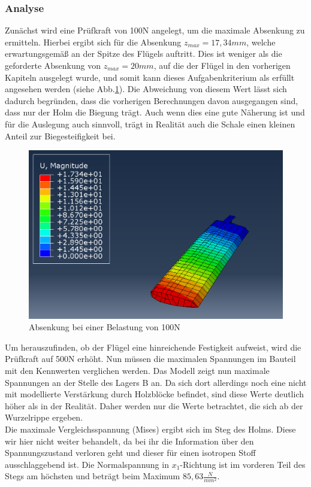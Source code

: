 \subsubsection{Analyse}
Zunächst wird eine Prüfkraft von 100N angelegt, um die maximale Absenkung zu ermitteln. Hierbei ergibt sich für die Absenkung $z_{max}=17,34mm$, welche erwartungsgemäß an der Spitze des Flügels auftritt. Dies ist weniger als die geforderte Absenkung von $z_{max}=20mm$, auf die der Flügel in den vorherigen Kapiteln ausgelegt wurde, und somit kann dieses Aufgabenkriterium als erfüllt angesehen werden (siehe Abb.\ref{Absenkung}). Die Abweichung von diesem Wert lässt sich dadurch begründen, dass die vorherigen Berechnungen davon ausgegangen sind, dass nur der Holm die Biegung trägt. Auch wenn dies eine gute Näherung ist und für die Auslegung auch sinnvoll, trägt in Realität auch die Schale einen kleinen Anteil zur Biegesteifigkeit bei.
\begin{figure}[h]
 \centering
 \includegraphics[scale=0.4]{Bilder/Absenkung_100N}
 \caption{Absenkung bei einer Belastung von 100N}
 \label{Absenkung}
\end{figure}
\noindent
Um herauszufinden, ob der Flügel eine hinreichende Festigkeit aufweist, wird die Prüfkraft auf 500N erhöht. Nun müssen die maximalen Spannungen im Bauteil mit den Kennwerten verglichen werden. Das Modell zeigt nun maximale Spannungen an der Stelle des Lagers B an. Da sich dort allerdings noch eine nicht mit modellierte Verstärkung durch Holzblöcke befindet, sind diese Werte deutlich höher als in der Realität. Daher werden nur die Werte betrachtet, die sich ab der Wurzelrippe ergeben.\\
Die maximale Vergleichsspannung (Mises) ergibt sich im Steg des Holms. Diese wir hier nicht weiter behandelt, da bei ihr die Information über den Spannungszustand verloren geht und dieser für einen isotropen Stoff ausschlaggebend ist. Die Normalspannung in $x_{1}$-Richtung ist im vorderen Teil des Stegs am höchsten und beträgt beim Maximum $85,63\frac{N}{mm^2}$.\\
